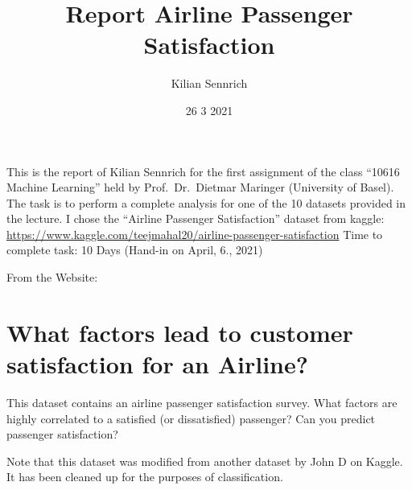 \documentclass[
]{article}
\title{Report Airline Passenger Satisfaction}
\author{Kilian Sennrich}
\date{26 3 2021}
\begin{document}
\maketitle

This is the report of Kilian Sennrich for the first assignment of the
class ``10616 Machine Learning'' held by Prof.~Dr.~Dietmar Maringer
(University of Basel). The task is to perform a complete analysis for
one of the 10 datasets provided in the lecture. I chose the ``Airline
Passenger Satisfaction'' dataset from kaggle:
\url{https://www.kaggle.com/teejmahal20/airline-passenger-satisfaction}
Time to complete task: 10 Days (Hand-in on April, 6., 2021)

From the Website:

\hypertarget{what-factors-lead-to-customer-satisfaction-for-an-airline}{%
\section{What factors lead to customer satisfaction for an
Airline?}\label{what-factors-lead-to-customer-satisfaction-for-an-airline}}

This dataset contains an airline passenger satisfaction survey. What
factors are highly correlated to a satisfied (or dissatisfied)
passenger? Can you predict passenger satisfaction?

Note that this dataset was modified from another dataset by John D on
Kaggle. It has been cleaned up for the purposes of classification.
\end{document}
